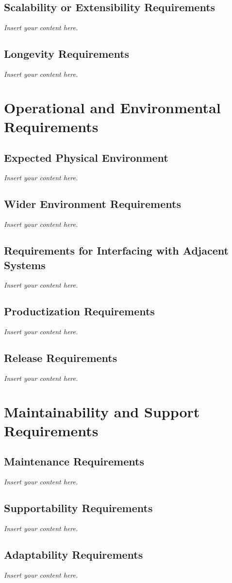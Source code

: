 \documentclass[12pt]{article}
\newcommand{\lips}{\textit{Insert your content here.}}
\begin{document}
\subsection{Scalability or Extensibility Requirements}
\lips
\subsection{Longevity Requirements}
\lips

\section{Operational and Environmental Requirements}
\subsection{Expected Physical Environment}
\lips
\subsection{Wider Environment Requirements}
\lips
\subsection{Requirements for Interfacing with Adjacent Systems}
\lips
\subsection{Productization Requirements}
\lips
\subsection{Release Requirements}
\lips

\section{Maintainability and Support Requirements}
\subsection{Maintenance Requirements}
\lips
\subsection{Supportability Requirements}
\lips
\subsection{Adaptability Requirements}
\lips
\end{document}
